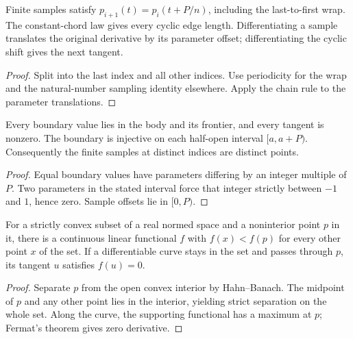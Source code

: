 \begin{lemma}
\label{lem:finite-cycle}
\leanok
{}
Finite samples satisfy $p_{i+1}(t)=p_i(t+P/n)$, including the last-to-first
wrap. The constant-chord law gives every cyclic edge length.
Differentiating a sample translates the original derivative by its
parameter offset; differentiating the cyclic shift gives the next tangent.
\end{lemma}
\begin{proof}
\leanok
Split into the last index and all other indices. Use periodicity for the
wrap and the natural-number sampling identity elsewhere. Apply the chain
rule to the parameter translations.
\end{proof}

\begin{lemma}
\label{lem:boundary-embedding}
\leanok
{}
Every boundary value lies in the body and its frontier, and every tangent
is nonzero. The boundary is injective on each half-open interval $[a,a+P)$.
Consequently the finite samples at distinct indices are distinct points.
\end{lemma}
\begin{proof}
\leanok
Equal boundary values have parameters differing by an integer multiple
of $P$. Two parameters in the stated interval force that integer strictly
between $-1$ and $1$, hence zero. Sample offsets lie in $[0,P)$.
\end{proof}

\begin{lemma}
\label{lem:support}
\leanok
{}
For a strictly convex subset of a real normed space and a noninterior
point $p$ in it, there is a continuous linear functional $f$ with
$f(x)<f(p)$ for every other point $x$ of the set. If a differentiable
curve stays in the set and passes through $p$, its tangent $u$ satisfies
$f(u)=0$.
\end{lemma}
\begin{proof}
\leanok
Separate $p$ from the open convex interior by Hahn--Banach. The midpoint
of $p$ and any other point lies in the interior, yielding strict separation
on the whole set. Along the curve, the supporting functional has a maximum
at $p$; Fermat's theorem gives zero derivative.
\end{proof}

